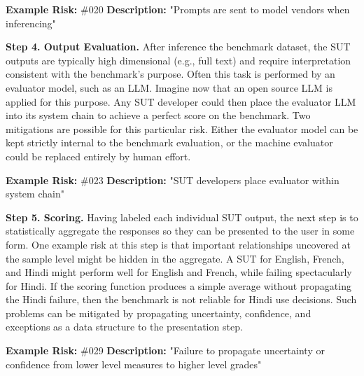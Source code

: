 \documentclass{article}
\begin{document}
\begin{center}
    \begin{tcolorbox}[colback=gray!10, colframe=black!50, width=\textwidth, boxrule=0.5mm, sharp corners, coltext=black]
        {\bf Example Risk:} \#020
        \newline
        {\bf Description:} "Prompts are sent to model vendors when inferencing"
    \end{tcolorbox}
\end{center}

{\bf Step 4. Output Evaluation.} After inference the benchmark dataset, the SUT outputs are typically high dimensional (e.g., full text) and require interpretation consistent with the benchmark's purpose. Often this task is performed by an evaluator model, such as an LLM. Imagine now that an open source LLM is applied for this purpose. Any SUT developer could then place the evaluator LLM into its system chain to achieve a perfect score on the benchmark. Two mitigations are possible for this particular risk. Either the evaluator model can be kept strictly internal to the benchmark evaluation, or the machine evaluator could be replaced entirely by human effort.

\begin{center}
    \begin{tcolorbox}[colback=gray!10, colframe=black!50, width=\textwidth, boxrule=0.5mm, sharp corners, coltext=black]
        {\bf Example Risk:} \#023
        \newline
        {\bf Description:} "SUT developers place evaluator within system chain"
    \end{tcolorbox}
\end{center}

{\bf Step 5. Scoring.} Having labeled each individual SUT output, the next step is to statistically aggregate the responses so they can be presented to the user in some form. One example risk at this step is that important relationships uncovered at the sample level might be hidden in the aggregate. A SUT for English, French, and Hindi might perform well for English and French, while failing spectacularly for Hindi. If the scoring function produces a simple average without propagating the Hindi failure, then the benchmark is not reliable for Hindi use decisions. Such problems can be mitigated by propagating uncertainty, confidence, and exceptions as a data structure to the presentation step.

\begin{center}
    \begin{tcolorbox}[colback=gray!10, colframe=black!50, width=\textwidth, boxrule=0.5mm, sharp corners, coltext=black]
        {\bf Example Risk:} \#029
        \newline
        {\bf Description:} "Failure to propagate uncertainty or confidence from lower level measures to higher level grades"
    \end{tcolorbox}
\end{center}
\end{document}
